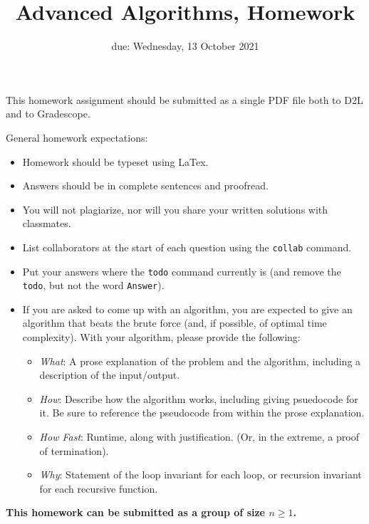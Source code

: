 \documentclass{article}
\title{Advanced Algorithms, Homework \hwnum}
\author{\todo{Your Name Here}}
\date{due: Wednesday, 13 October 2021}
\begin{document}
\maketitle

This homework assignment should be
submitted as a single PDF file both to D2L and to Gradescope.

General homework expectations:
\begin{itemize}
    \item Homework should be typeset using LaTex.
    \item Answers should be in complete sentences and proofread.
    \item You will not plagiarize, nor will you share your written solutions
        with classmates.
    \item List collaborators at the start of each question using the
        \texttt{collab} command.
    \item Put your answers where the \texttt{todo} command currently is (and
        remove the \texttt{todo}, but not the word \texttt{Answer}).
    \item If you are asked to come up with an algorithm, you are
        expected to give an algorithm that beats the brute force (and, if possible, of
        optimal time complexity). With your algorithm, please provide the following:
        \begin{itemize}
            \item \emph{What}: A prose explanation of the problem and the algorithm,
                including a description of the input/output.
            \item \emph{How}: Describe how the algorithm works, including giving
                psuedocode for it.  Be sure to reference the pseudocode
                from within the prose explanation.
            \item \emph{How Fast}: Runtime, along with justification.  (Or, in the
                extreme, a proof of termination).
            \item \emph{Why}: Statement of the loop invariant for each loop, or
                recursion invariant for each recursive function.
        \end{itemize}
\end{itemize}

{\bf
This homework can be submitted as a group of size $n \geq 1$.
}

\collab{\todo{}}
\end{document}
